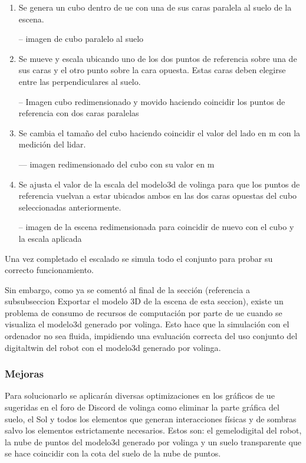 \documentclass[a4paper, 12pt, spanish, twoside]{article}
\begin{document}
\begin{enumerate} 

\item Se genera un cubo dentro de \acrshort{ue} con una de sus caras paralela al suelo de la escena. 

-- imagen de cubo paralelo al suelo 

\item Se mueve y escala ubicando uno de los dos puntos de referencia sobre una de sus caras y el otro punto sobre la cara opuesta. Estas caras deben elegirse entre las perpendiculares al suelo. 

-- Imagen cubo redimensionado y movido haciendo coincidir los puntos de referencia con dos caras paralelas 

\item Se cambia el tamaño del cubo haciendo coincidir el valor del lado en \acrshort{m} con la medición del \acrshort{lidar}. 

--- imagen redimensionado del cubo con su valor en m 

\item Se ajusta el valor de la escala del \gls{modelo3d} de \gls{volinga} para que los puntos de referencia vuelvan a estar ubicados ambos en las dos caras opuestas del cubo seleccionadas anteriormente. 

-- imagen de la escena redimensionada para coincidir de nuevo con el cubo y la escala aplicada 

\end{enumerate} 

Una vez completado el escalado se simula todo el conjunto para probar su correcto funcionamiento. 

Sin embargo, como ya se comentó al final de la sección (referencia a subsubseccion Exportar el modelo 3D de la escena de esta seccion), existe un problema de consumo de recursos de computación por parte de \acrshort{ue} cuando se visualiza el \gls{modelo3d} generado por \gls{volinga}. Esto hace que la simulación con el ordenador no sea fluida, impidiendo una evaluación correcta del uso conjunto del \gls{digitaltwin} del robot con el \gls{modelo3d} generado por \gls{volinga}. 

\subsubsection{Mejoras} \label{sec:implementacion:nerfstudio-volinga:mejoras}

Para solucionarlo se aplicarán diversas optimizaciones en los gráficos de \acrshort{ue} sugeridas en el foro de Discord de \gls{volinga} como eliminar la parte gráfica del suelo, el Sol y todos los elementos que generan interacciones físicas y de sombras salvo los elementos estrictamente necesarios. Estos son: el \gls{gemelodigital} del robot, la nube de puntos del \gls{modelo3d} generado por \gls{volinga} y un suelo transparente que se hace coincidir con la cota del suelo de la nube de puntos. 
\end{document}
